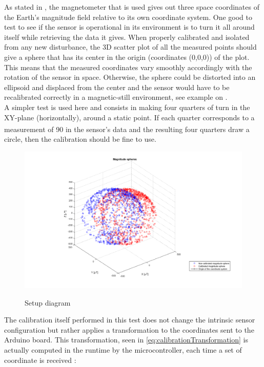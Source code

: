 As stated in , the magnetometer that is used gives out three space coordinates of the Earth's magnitude field relative to its own coordinate system. One good to test to see if the sensor is operational in its environment is to turn it all around itself while retrieving the data it gives. When properly calibrated and isolated from any new disturbance, the 3D scatter plot of all the measured points should give a sphere that has its center in the origin (coordinates (0,0,0)) of the plot. This means that the measured coordinates vary smoothly accordingly with the rotation of the sensor in space. Otherwise, the sphere could be distorted into an ellipsoid and displaced from the center and the sensor would have to be recalibrated correctly in a magnetic-still environment, see example on .\\
A simpler test is used here and consists in making four quarters of turn in the XY-plane (horizontally), around a static point. If each quarter corresponds to a measurement of \si{90^{\circ}} in the sensor's data and the resulting four quarters draw a circle, then the calibration should be fine to use.
\begin{figure}[H]
    \centering
  {
    \includegraphics[width=1.2\textwidth]{figures/spheresMagnitude.png}
  }
  \caption{Setup diagram}
  \label{fig:calibrationTestSpheres}
\end{figure}
%
The calibration itself performed in this test does not change the intrinsic sensor configuration but rather applies a transformation to the coordinates sent to the Arduino board. This transformation, seen in \eqref{eq:calibrationTransformation} is actually computed in the runtime by the microcontroller, each time a set of coordinate is received :
